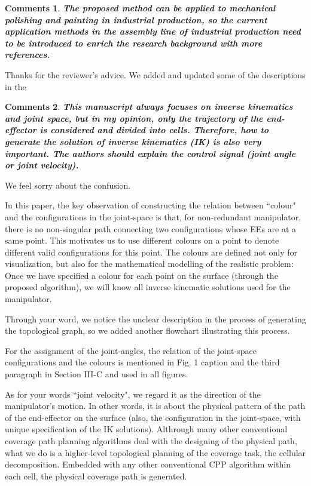 \documentclass[utf8]{article}
\newtheorem{theorem}{Comments}[section]
\begin{document}
\begin{theorem}
\textbf{The proposed method can be applied to mechanical polishing and painting in industrial production, so the current application methods in the assembly line of industrial production need to be introduced to enrich the research background with more references.} 
\end{theorem}

Thanks for the reviewer's advice. We added and updated some of the descriptions in the 

\begin{theorem}
\textbf{This manuscript always focuses on inverse kinematics and joint space, but in my opinion, only the trajectory of the end-effector is considered and divided into cells. Therefore, how to generate the solution of inverse kinematics (IK) is also very important. The authors should explain the control signal (joint angle or joint velocity). }
\end{theorem}

We feel sorry about the confusion. 

In this paper, the key observation of constructing the relation between ``colour" and the configurations in the joint-space is that, for non-redundant manipulator, there is no non-singular path connecting two configurations whose EEs are at a same point. This motivates us to use different colours on a point to denote different valid configurations for this point. 
The colours are defined not only for visualization, but also for the mathematical modelling of the realistic problem: Once we have specified a colour for each point on the surface (through the proposed algorithm), we will know all inverse kinematic solutions used for the manipulator. 

Through your word, we notice the unclear description in the process of generating the topological graph, so we added another flowchart illustrating this process. 

For the assignment of the joint-angles, the relation of the joint-space configurations and the colours is mentioned in Fig. 1 caption and the third paragraph in Section III-C and used in all figures. 

As for your words ``joint velocity", we regard it as the direction of the manipulator's motion. In other words, it is about the physical pattern of the path of the end-effector on the surface (also, the configuration in the joint-space, with unique specification of the IK solutions). Althrough many other conventional coverage path planning algorithms deal with the designing of the physical path, 
what we do is a higher-level topological planning of the coverage task, the cellular decomposition. Embedded with any other conventional CPP algorithm within each cell, the physical coverage path is generated. 
\end{document}
